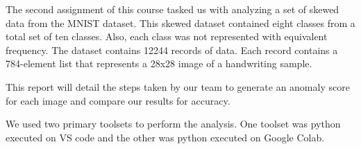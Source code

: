 The second assignment of this course tasked us with analyzing a set of skewed data from the MNIST dataset. This skewed dataset contained eight classes from a total set of ten classes. Also, each class was not represented with equivalent frequency. The dataset contains 12244 records of data. Each record contains a 784-element list that represents a 28x28 image of a handwriting sample.

This report will detail the steps taken by our team to generate an anomaly score for each image and compare our results for accuracy.

We used two primary toolsets to perform the analysis. One toolset was python executed on VS code and the other was python executed on Google Colab.